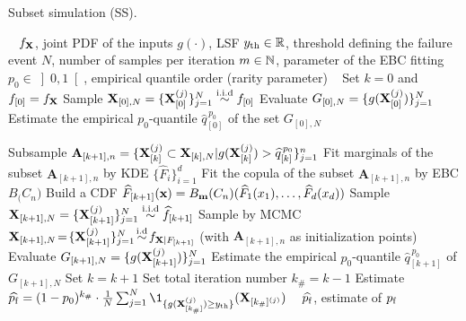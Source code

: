 \begin{algorithm}[h]
    \caption{Subset simulation (SS).}\label{alg:ss}
    \footnotesize
    \begin{algorithmic}
        \State {}\hfill~
        \State $f_{\bf X}$, joint PDF of the inputs
        \State $g(\cdot)$, LSF
        \State $y_\mathrm{th} \in \mathbb{R}$, threshold defining the failure event 
        \State $N$, number of samples per iteration
        \State $m \in \mathbb{N}$, parameter of the EBC fitting
        \State $p_0 \in \left]0, 1\right[$, empirical quantile order (rarity parameter)
        \State {}\hfill~
        \State Set $k = 0$ and $f_{[0]} = f_{\bf X}$
        \State Sample ${\bf X}_{[0], N} = \{{\bf X}_{[0]}^{(j)}\}_{j=1}^N \overset{\text{i.i.d}}{\sim} f_{[0]}$
        \State Evaluate $G_{[0], N} = \{g({\bf X}_{[0]}^{(j)})\}_{j=1}^N$
        \State Estimate the empirical $p_0$-quantile $\widehat{q}_{[0]}^{\, p_0}$ of the set $G_{[0], N}$
        
        \State Subsample $\mathbf{A}_{[k+1], n}=\{{\bf X}_{[k]}^{(j)} \subset {\bf X}_{[k], N}| g({\bf X}_{[k]}^{(j)}) > \widehat{q}_{[k]}^{\, p_0} \}_{j=1}^n$
        \State Fit marginals of the subset $\mathbf{A}_{[k+1], n}$ by KDE $\{\widehat{F}_i\}_{i=1}^d$
        \State Fit the copula of the subset $\mathbf{A}_{[k+1], n}$ by EBC $B_\bm(C_n)$
        \State Build a CDF $\widehat{F}_{[k+1]}({\bf x}) = B_{\bf m}(C_n)(\widehat{F}_1(x_1), \dots, \widehat{F}_d(x_d))$
        \State Sample ${\bf X}_{[k+1], N} = \{{\bf X}_{[k+1]}^{(j)}\}_{j=1}^N \overset{\text{i.i.d}}{\sim} \widehat{f}_{[k+1]}$
        \State Sample by MCMC ${\bf X}_{[k+1], N} \!=\! \{{\bf X}_{[k+1]}^{(j)}\}_{j=1}^N \!\overset{\text{i.d}}{\sim}\! f_{{\bf X} | F_{[k+1]}}$ (with $\mathbf{A}_{[k+1], n}$ as initialization points)
        \State Evaluate $G_{[k+1], N} = \{g({\bf X}_{[k+1]}^{(j)})\}_{j=1}^N$
        \State Estimate the empirical $p_0$-quantile $\widehat{q}_{[k+1]}^{\, p_0}$ of $G_{[k+1], N}$
        \State Set $k = k+1$
        \EndWhile
        \State Set total iteration number $k_\# = k-1$ 
        \State Estimate $\widehat{\pf} = (1 - p_0)^{k_\#} \cdot \frac{1}{N} \sum_{j=1}^N \1_{\{g(\bX_{[k_\#]}^{(j)}) \geq \yth  \}}(\bX_{[k_\#]^{(j)}}) $
        \State {}\hfill~
        \State $\widehat{p_\mathrm{f}}$, estimate of $p_\mathrm{f}$
    \end{algorithmic}
    \end{algorithm}












